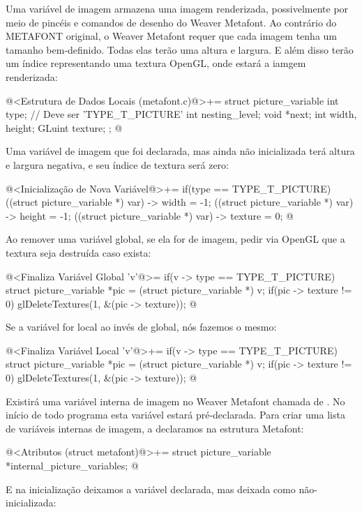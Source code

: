 
Uma variável de imagem armazena uma imagem renderizada, possivelmente
por meio de pincéis e comandos de desenho do Weaver Metafont. Ao
contrário do METAFONT original, o Weaver Metafont requer que cada
imagem tenha um tamanho bem-definido. Todas elas terão uma altura e
largura. E além disso terão um índice representando uma textura
OpenGL, onde estará a iamgem renderizada:

\iniciocodigo
@<Estrutura de Dados Locais (metafont.c)@>+=
struct picture_variable{
  int type; // Deve ser 'TYPE_T_PICTURE'
  int nesting_level;
  void *next;
  int width, height;
  GLuint texture;
};
@
\fimcodigo

Uma variável de imagem que foi declarada, mas ainda não inicializada
terá altura e largura negativa, e seu índice de textura será zero:

\iniciocodigo
@<Inicialização de Nova Variável@>+=
if(type == TYPE_T_PICTURE){
  ((struct picture_variable *) var) -> width = -1;
  ((struct picture_variable *) var) -> height = -1;
  ((struct picture_variable *) var) -> texture = 0;
}
@
\fimcodigo

Ao remover uma variável global, se ela for de imagem, pedir via OpenGL
que a textura seja destruída caso exista:

\iniciocodigo
@<Finaliza Variável Global 'v'@>=
if(v -> type == TYPE_T_PICTURE){
  struct picture_variable *pic = (struct picture_variable *) v;
  if(pic -> texture != 0)
    glDeleteTextures(1, &(pic -> texture));
}
@
\fimcodigo

Se a variável for local ao invés de global, nós fazemos o mesmo:

\iniciocodigo
@<Finaliza Variável Local 'v'@>+=
if(v -> type == TYPE_T_PICTURE){
  struct picture_variable *pic = (struct picture_variable *) v;
  if(pic -> texture != 0)
    glDeleteTextures(1, &(pic -> texture));
}
@
\fimcodigo

Existirá uma variável interna de imagem no Weaver Metafont chamada
de . No início de todo programa esta
variável estará pré-declarada. Para criar uma lista de variáveis
internas de imagem, a declaramos na estrutura Metafont:

\iniciocodigo
@<Atributos (struct metafont)@>+=
struct picture_variable *internal_picture_variables;
@
\fimcodigo

E na inicialização deixamos a variável 
declarada, mas deixada como não-inicializada:

